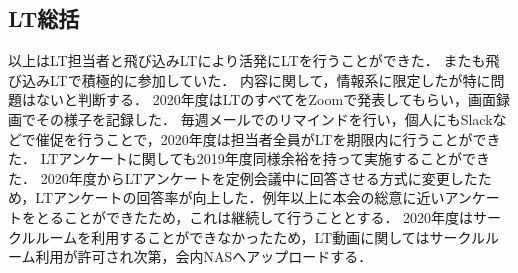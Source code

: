 \subsection*{LT総括}


\secondGrade{}以上はLT担当者と飛び込みLTにより活発にLTを行うことができた．
また\firstGrade{}も飛び込みLTで積極的に参加していた．
内容に関して，情報系に限定したが特に問題はないと判断する．
2020年度はLTのすべてをZoomで発表してもらい，画面録画でその様子を記録した．
毎週メールでのリマインドを行い，個人にもSlackなどで催促を行うことで，2020年度は担当者全員がLTを期限内に行うことができた．
LTアンケートに関しても2019年度同様余裕を持って実施することができた．
2020年度からLTアンケートを定例会議中に回答させる方式に変更したため，LTアンケートの回答率が向上した．例年以上に本会の総意に近いアンケートをとることができたため，これは継続して行うこととする．
2020年度はサークルルームを利用することができなかったため，LT動画に関してはサークルルーム利用が許可され次第，会内NASへアップロードする．
